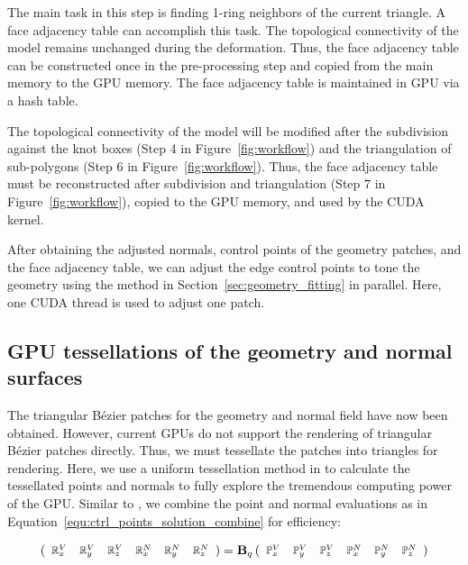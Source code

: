 \documentclass[3p]{elsarticle}
\begin{document}
The main task in this step is finding 1-ring neighbors of the current triangle. A face adjacency table can accomplish
this task. The topological connectivity of the model remains unchanged during the deformation. Thus, the face adjacency
table can be constructed once in the pre-processing step and copied from the main memory to the GPU memory. The face
adjacency table is maintained in GPU via a hash table.

The topological connectivity of the model will be modified after the subdivision against the knot boxes (Step 4 in
Figure~\ref{fig:workflow}) and the triangulation of sub-polygons (Step 6 in Figure~\ref{fig:workflow}). Thus, the face
adjacency table must be reconstructed after subdivision and triangulation (Step 7 in Figure~\ref{fig:workflow}), copied
to the GPU memory, and used by the CUDA kernel.

After obtaining the adjusted normals, control points of the geometry patches, and the face adjacency table, we can
adjust the edge control points to tone the geometry using the method in Section~\ref{sec:geometry_fitting} in parallel.
Here, one CUDA thread is used to adjust one patch.

\subsection{GPU tessellations of the geometry and normal surfaces}

The triangular B\'ezier patches for the geometry and normal field have now been obtained. However, current GPUs do not
support the rendering of triangular B\'ezier patches directly. Thus, we must tessellate the patches into triangles for
rendering. Here, we use a uniform tessellation method in \cite{Cui14} to calculate the tessellated points and normals to
fully explore the tremendous computing power of the GPU. Similar to \cite{Cui14}, we combine the point and normal
evaluations as in Equation~\ref{equ:ctrl_points_solution_combine} for efficiency:

\begin{equation}
	\footnotesize
	\left(
		\begin{array}{cccccc}
			\mathbb R^V_x & \mathbb R^V_y & \mathbb R^V_z & \mathbb R^N_x & \mathbb R^N_y & \mathbb R^N_z
		\end{array}
	\right)
	=
	\mathbf B_q
	\left(
		\begin{array}{cccccc}
			\mathbb P^V_x & \mathbb P^V_y & \mathbb P^V_z & \mathbb P^N_x & \mathbb P^N_y & \mathbb P^N_z
		\end{array}
	\right)
	\label{equ:last}
\end{equation}
\end{document}
